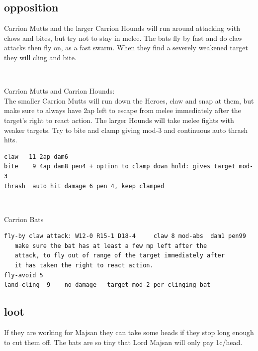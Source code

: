 \subsection*{opposition}
Carrion Mutts and the larger Carrion Hounds will run around attacking with claws and bites, but try not to stay in melee. The bats fly by fast and do claw attacks then fly on, as a fast swarm. When they find a severely weakened target they will cling and bite.

\

Carrion Mutts and Carrion Hounds:\\
The smaller Carrion Mutts will run down the Heroes, claw and snap at them, but make sure to always have 2ap left to escape from melee immediately after the target's right to react action.
The larger Hounds will take melee fights with weaker targets. Try to bite and clamp giving mod-3 and continuous auto thrash hits.
\small \begin{verbatim}
claw   11 2ap dam6
bite    9 4ap dam8 pen4 + option to clamp down hold: gives target mod-3
thrash  auto hit damage 6 pen 4, keep clamped

\end{verbatim} \normalsize

\

Carrion Bats
\small \begin{verbatim}
fly-by claw attack: W12-0 R15-1 D18-4     claw 8 mod-abs  dam1 pen99
   make sure the bat has at least a few mp left after the
   attack, to fly out of range of the target immediately after
   it has taken the right to react action.
fly-avoid 5
land-cling  9    no damage   target mod-2 per clinging bat

\end{verbatim} \normalsize



\subsection*{loot}
If they are working for Majsan they can take some heads if they stop long enough to cut them off. The bats are so tiny that Lord Majsan will only pay 1c/head.











